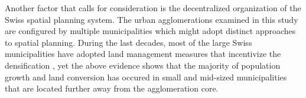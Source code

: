 \documentclass[10pt,letterpaper]{article}
\begin{document}
Another factor that calls for consideration is the decentralized organization of the Swiss spatial planning system.
The urban agglomerations examined in this study are configured by multiple municipalities which might adopt distinct approaches to spatial planning.
During the last decades, most of the large Swiss municipalities have adopted land management measures that incentivize the densification \cite{rudolf2018planning}, yet the above evidence shows that the majority of population growth and land conversion has occured in small and mid-sized municipalities that are located further away from the agglomeration core.
\end{document}
